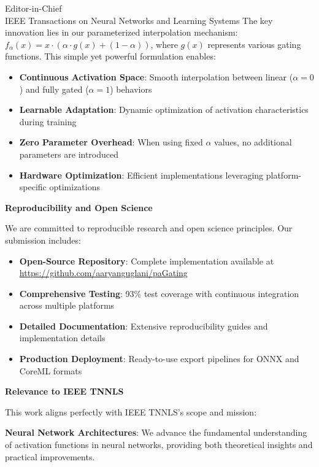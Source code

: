 \documentclass[11pt]{letter}
\begin{document}
\begin{letter}{Editor-in-Chief\\
IEEE Transactions on Neural Networks and Learning Systems}
The key innovation lies in our parameterized interpolation mechanism: $f_{\alpha}(x) = x \cdot (\alpha \cdot g(x) + (1-\alpha))$, where $g(x)$ represents various gating functions. This simple yet powerful formulation enables:

\begin{itemize}
    \item \textbf{Continuous Activation Space}: Smooth interpolation between linear ($\alpha=0$) and fully gated ($\alpha=1$) behaviors
    \item \textbf{Learnable Adaptation}: Dynamic optimization of activation characteristics during training
    \item \textbf{Zero Parameter Overhead}: When using fixed $\alpha$ values, no additional parameters are introduced
    \item \textbf{Hardware Optimization}: Efficient implementations leveraging platform-specific optimizations
\end{itemize}

\textbf{\large Reproducibility and Open Science}

\vspace{0.5em}

We are committed to reproducible research and open science principles. Our submission includes:

\begin{itemize}
    \item \textbf{Open-Source Repository}: Complete implementation available at \url{https://github.com/aaryanguglani/paGating}
    \item \textbf{Comprehensive Testing}: 93\% test coverage with continuous integration across multiple platforms
    \item \textbf{Detailed Documentation}: Extensive reproducibility guides and implementation details
    \item \textbf{Production Deployment}: Ready-to-use export pipelines for ONNX and CoreML formats
\end{itemize}

\textbf{\large Relevance to IEEE TNNLS}

\vspace{0.5em}

This work aligns perfectly with IEEE TNNLS's scope and mission:

\textbf{Neural Network Architectures}: We advance the fundamental understanding of activation functions in neural networks, providing both theoretical insights and practical improvements.


\end{letter}
\end{document}
